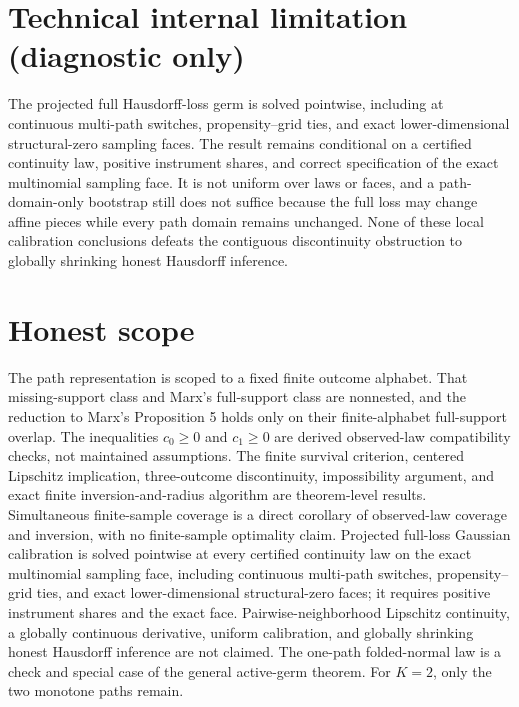 \documentclass{article}
\begin{document}
\section*{Technical internal limitation (diagnostic only)}

The projected full Hausdorff-loss germ is solved pointwise, including at continuous multi-path switches, propensity--grid ties, and exact lower-dimensional structural-zero sampling faces. The result remains conditional on a certified continuity law, positive instrument shares, and correct specification of the exact multinomial sampling face. It is not uniform over laws or faces, and a path-domain-only bootstrap still does not suffice because the full loss may change affine pieces while every path domain remains unchanged. None of these local calibration conclusions defeats the contiguous discontinuity obstruction to globally shrinking honest Hausdorff inference.

\section{Honest scope}

The path representation is scoped to a fixed finite outcome alphabet. That missing-support class and Marx's full-support class are nonnested, and the reduction to Marx's Proposition 5 holds only on their finite-alphabet full-support overlap. The inequalities \(c_0\ge0\) and \(c_1\ge0\) are derived observed-law compatibility checks, not maintained assumptions. The finite survival criterion, centered Lipschitz implication, three-outcome discontinuity, impossibility argument, and exact finite inversion-and-radius algorithm are theorem-level results. Simultaneous finite-sample coverage is a direct corollary of observed-law coverage and inversion, with no finite-sample optimality claim. Projected full-loss Gaussian calibration is solved pointwise at every certified continuity law on the exact multinomial sampling face, including continuous multi-path switches, propensity--grid ties, and exact lower-dimensional structural-zero faces; it requires positive instrument shares and the exact face. Pairwise-neighborhood Lipschitz continuity, a globally continuous derivative, uniform calibration, and globally shrinking honest Hausdorff inference are not claimed. The one-path folded-normal law is a check and special case of the general active-germ theorem. For \(K=2\), only the two monotone paths remain.
\end{document}
